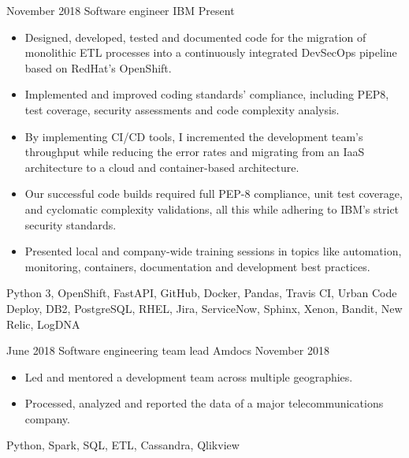 %
%
%


\begin{experiences}
    \experience
        {November 2018}
        {Software engineer}
        {IBM}
        {Present}
        {
            \begin{itemize}
                \item Designed, developed, tested and documented code for the 
                migration of monolithic ETL processes into a continuously 
                integrated DevSecOps pipeline based on RedHat's OpenShift.
                \item Implemented and improved coding standards' compliance, 
                including PEP8, test coverage, security assessments and code 
                complexity analysis.
                \item By implementing CI/CD tools, I incremented the development 
                team's throughput while reducing the error rates and migrating 
                from an IaaS architecture to a cloud and container-based 
                architecture.
				\item Our successful code builds required full PEP-8 
                compliance, unit test coverage, and cyclomatic complexity 
                validations, all this while adhering to IBM's strict security 
                standards.
				\item Presented local and company-wide training sessions in 
                topics like automation, monitoring, containers, documentation 
                and development best practices.
            \end{itemize}
        }
        {
            Python 3,
            OpenShift,
            FastAPI,
            GitHub,
            Docker,
            Pandas,
            Travis CI,
            Urban Code Deploy,
            DB2,
            PostgreSQL,
            RHEL,
            Jira,
            ServiceNow,
            Sphinx,
            Xenon,
            Bandit,
            New Relic,
            LogDNA
        }

    \emptySeparator

    \experience
        {June 2018}
        {Software engineering team lead}
        {Amdocs}
        {November 2018}
        {
            \begin{itemize}
                \item Led and mentored a development team across multiple 
                geographies.
                \item Processed, analyzed and reported 
                the data of a major telecommunications company.
            \end{itemize}
        }
        {
            Python,
            Spark,
            SQL,
            ETL,
            Cassandra,
            Qlikview
        }


\end{experiences}
